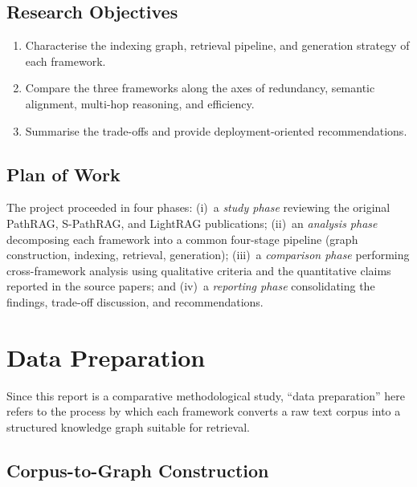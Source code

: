 \documentclass[12pt,a4paper,oneside]{report}
\begin{document}
\section{Research Objectives}

\begin{enumerate}[leftmargin=2em,itemsep=2pt]
    \item Characterise the indexing graph, retrieval pipeline, and
          generation strategy of each framework.
    \item Compare the three frameworks along the axes of redundancy,
          semantic alignment, multi-hop reasoning, and efficiency.
    \item Summarise the trade-offs and provide deployment-oriented
          recommendations.
\end{enumerate}

\section{Plan of Work}

The project proceeded in four phases: (i)~a \emph{study phase} reviewing
the original PathRAG, S-PathRAG, and LightRAG publications; (ii)~an
\emph{analysis phase} decomposing each framework into a common four-stage
pipeline (graph construction, indexing, retrieval, generation); (iii)~a
\emph{comparison phase} performing cross-framework analysis using
qualitative criteria and the quantitative claims reported in the source
papers; and (iv)~a \emph{reporting phase} consolidating the findings,
trade-off discussion, and recommendations.

\chapter{Data Preparation}
\label{ch:data_preparation}

Since this report is a comparative methodological study, ``data preparation''
here refers to the process by which each framework converts a raw text
corpus into a structured knowledge graph suitable for retrieval.

\section{Corpus-to-Graph Construction}
\end{document}
